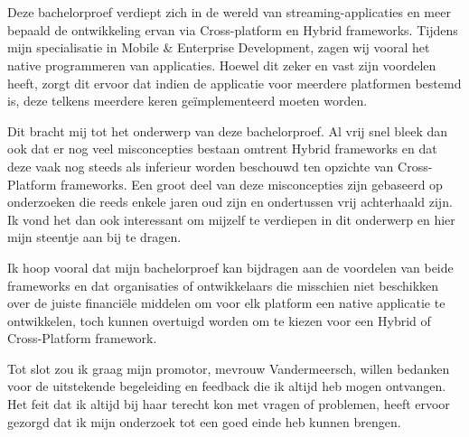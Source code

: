 
\chapter*{}%
\label{ch:voorwoord}


Deze bachelorproef verdiept zich in de wereld van streaming-applicaties en meer bepaald de ontwikkeling ervan via Cross-platform en Hybrid frameworks. Tijdens mijn specialisatie in Mobile \& Enterprise Development, zagen wij vooral het native programmeren van applicaties. Hoewel dit zeker en vast zijn voordelen heeft, zorgt dit ervoor dat indien de applicatie voor meerdere platformen bestemd is, deze telkens meerdere keren geïmplementeerd moeten worden.

Dit bracht mij tot het onderwerp van deze bachelorproef. Al vrij snel bleek dan ook dat er nog veel misconcepties bestaan omtrent Hybrid frameworks en dat deze vaak nog steeds als inferieur worden beschouwd ten opzichte van Cross-Platform frameworks. Een groot deel van deze misconcepties zijn gebaseerd op onderzoeken die reeds enkele jaren oud zijn en ondertussen vrij achterhaald zijn. Ik vond het dan ook interessant om mijzelf te verdiepen in dit onderwerp en hier mijn steentje aan bij te dragen.

Ik hoop vooral dat mijn bachelorproef kan bijdragen aan de voordelen van beide frameworks en dat organisaties of ontwikkelaars die misschien niet beschikken over de juiste financiële middelen om voor elk platform een native applicatie te ontwikkelen, toch kunnen overtuigd worden om te kiezen voor een Hybrid of Cross-Platform framework.

Tot slot zou ik graag mijn promotor, mevrouw Vandermeersch, willen bedanken voor de uitstekende begeleiding en feedback die ik altijd heb mogen ontvangen. Het feit dat ik altijd bij haar terecht kon met vragen of problemen, heeft ervoor gezorgd dat ik mijn onderzoek tot een goed einde heb kunnen brengen.